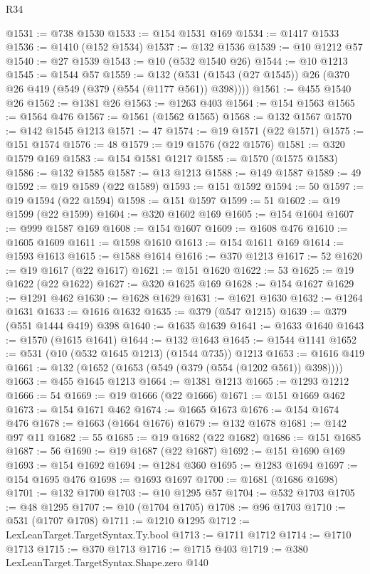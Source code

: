 \begin{lexlean}{R34}
\begin{coremodule}
@1531 := @738 @1530
@1533 := @154 @1531 @169
@1534 := @1417 @1533
@1536 := @1410 (@152 @1534)
@1537 := @132 @1536
@1539 := @10 @1212 @57
@1540 := @27 @1539
@1543 := @10 (@532 @1540 @26)
@1544 := @10 @1213
@1545 := @1544 @57
@1559 := @132 (@531 (@1543 (@27 @1545)) @26 (@370 @26 @419 (@549 (@379 (@554 (@1177 @561)) @398))))
@1561 := @455 @1540 @26
@1562 := @1381 @26
@1563 := @1263 @403
@1564 := @154 @1563
@1565 := @1564 @476
@1567 := @1561 (@1562 @1565)
@1568 := @132 @1567
@1570 := @142 @1545 @1213
@1571 := 47
@1574 := @19 @1571 (@22 @1571)
@1575 := @151 @1574
@1576 := 48
@1579 := @19 @1576 (@22 @1576)
@1581 := @320 @1579 @169
@1583 := @154 @1581 @1217
@1585 := @1570 (@1575 @1583)
@1586 := @132 @1585
@1587 := @13 @1213
@1588 := @149 @1587
@1589 := 49
@1592 := @19 @1589 (@22 @1589)
@1593 := @151 @1592
@1594 := 50
@1597 := @19 @1594 (@22 @1594)
@1598 := @151 @1597
@1599 := 51
@1602 := @19 @1599 (@22 @1599)
@1604 := @320 @1602 @169
@1605 := @154 @1604
@1607 := @999 @1587 @169
@1608 := @154 @1607
@1609 := @1608 @476
@1610 := @1605 @1609
@1611 := @1598 @1610
@1613 := @154 @1611 @169
@1614 := @1593 @1613
@1615 := @1588 @1614
@1616 := @370 @1213
@1617 := 52
@1620 := @19 @1617 (@22 @1617)
@1621 := @151 @1620
@1622 := 53
@1625 := @19 @1622 (@22 @1622)
@1627 := @320 @1625 @169
@1628 := @154 @1627
@1629 := @1291 @462
@1630 := @1628 @1629
@1631 := @1621 @1630
@1632 := @1264 @1631
@1633 := @1616 @1632
@1635 := @379 (@547 @1215)
@1639 := @379 (@551 @1444 @419) @398
@1640 := @1635 @1639
@1641 := @1633 @1640
@1643 := @1570 (@1615 @1641)
@1644 := @132 @1643
@1645 := @1544 @1141
@1652 := @531 (@10 (@532 @1645 @1213) (@1544 @735)) @1213
@1653 := @1616 @419
@1661 := @132 (@1652 (@1653 (@549 (@379 (@554 (@1202 @561)) @398))))
@1663 := @455 @1645 @1213
@1664 := @1381 @1213
@1665 := @1293 @1212
@1666 := 54
@1669 := @19 @1666 (@22 @1666)
@1671 := @151 @1669 @462
@1673 := @154 @1671 @462
@1674 := @1665 @1673
@1676 := @154 @1674 @476
@1678 := @1663 (@1664 @1676)
@1679 := @132 @1678
@1681 := @142 @97 @11
@1682 := 55
@1685 := @19 @1682 (@22 @1682)
@1686 := @151 @1685
@1687 := 56
@1690 := @19 @1687 (@22 @1687)
@1692 := @151 @1690 @169
@1693 := @154 @1692
@1694 := @1284 @360
@1695 := @1283 @1694
@1697 := @154 @1695 @476
@1698 := @1693 @1697
@1700 := @1681 (@1686 @1698)
@1701 := @132 @1700
@1703 := @10 @1295 @57
@1704 := @532 @1703
@1705 := @48 @1295
@1707 := @10 (@1704 @1705)
@1708 := @96 @1703
@1710 := @531 (@1707 @1708)
@1711 := @1210 @1295
@1712 := LexLeanTarget.TargetSyntax.Ty.bool
@1713 := @1711 @1712
@1714 := @1710 @1713
@1715 := @370 @1713
@1716 := @1715 @403
@1719 := @380 LexLeanTarget.TargetSyntax.Shape.zero @140

\end{coremodule}
\end{lexlean}
